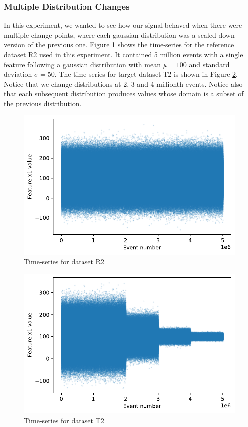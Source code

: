 \documentclass[sigconf]{acmart}
\begin{document}
\subsubsection{Multiple Distribution Changes}
In this experiment, we wanted to see how our signal behaved when there were multiple change points, where each gaussian distribution was a scaled down version of the previous one. Figure \ref{fig:timeseries-r2} shows the time-series for the reference dataset R2 used in this experiment. It contained 5 million events with a single feature following a gaussian distribution with mean $\mu=100$ and standard deviation $\sigma=50$. The time-series for target dataset T2 is shown in Figure \ref{fig:timeseries-t2}. Notice that we change distributions at 2, 3 and 4 millionth events. Notice also that each subsequent distribution produces values whose domain is a subset of the previous distribution.
\begin{figure}[!htb]
    \begin{center}
      \includegraphics[scale=0.5]{figures/timeseries-r2.pdf}
      \caption{Time-series for dataset R2}
      \label{fig:timeseries-r2}
    \end{center}
\end{figure}
\begin{figure}[!htb]
    \begin{center}
      \includegraphics[scale=0.5]{figures/timeseries-t2.pdf}
      \caption{Time-series for dataset T2}
     \label{fig:timeseries-t2}
    \end{center}
\end{figure}
\end{document}

